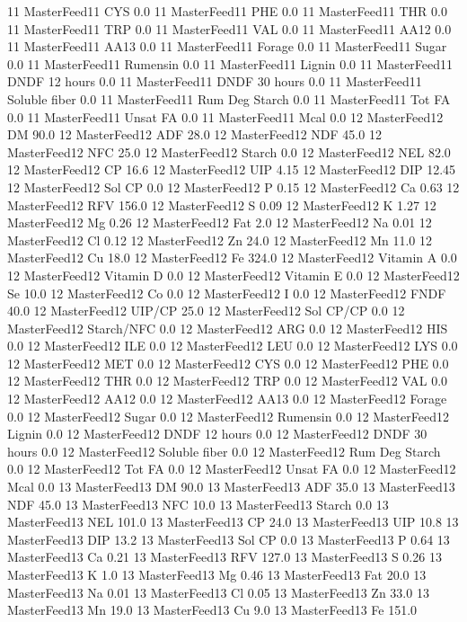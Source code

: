 \documentclass[letterpaper,10pt,english]{sphinxmanual}
\begin{document}
\begin{sphinxVerbatim}[commandchars=\\\{\},numbers=left,firstnumber=1,stepnumber=1]
11 MasterFeed11 CYS 0.0
11 MasterFeed11 PHE 0.0
11 MasterFeed11 THR 0.0
11 MasterFeed11 TRP 0.0
11 MasterFeed11 VAL 0.0
11 MasterFeed11 AA\PYGZsh{}12 0.0
11 MasterFeed11 AA\PYGZsh{}13 0.0
11 MasterFeed11 \PYGZpc{} Forage 0.0
11 MasterFeed11 Sugar \PYGZpc{} 0.0
11 MasterFeed11 Rumensin 0.0
11 MasterFeed11 Lignin 0.0
11 MasterFeed11 DNDF 12 hours 0.0
11 MasterFeed11 DNDF 30 hours 0.0
11 MasterFeed11 Soluble fiber 0.0
11 MasterFeed11 Rum Deg Starch 0.0
11 MasterFeed11 Tot FA 0.0
11 MasterFeed11 Unsat FA 0.0
11 MasterFeed11 Mcal 0.0
12 MasterFeed12 DM 90.0
12 MasterFeed12 ADF 28.0
12 MasterFeed12 NDF 45.0
12 MasterFeed12 NFC 25.0
12 MasterFeed12 Starch 0.0
12 MasterFeed12 NEL 82.0
12 MasterFeed12 CP 16.6
12 MasterFeed12 UIP 4.15
12 MasterFeed12 DIP 12.45
12 MasterFeed12 Sol CP 0.0
12 MasterFeed12 P 0.15
12 MasterFeed12 Ca 0.63
12 MasterFeed12 RFV 156.0
12 MasterFeed12 S 0.09
12 MasterFeed12 K 1.27
12 MasterFeed12 Mg 0.26
12 MasterFeed12 Fat 2.0
12 MasterFeed12 Na 0.01
12 MasterFeed12 Cl 0.12
12 MasterFeed12 Zn 24.0
12 MasterFeed12 Mn 11.0
12 MasterFeed12 Cu 18.0
12 MasterFeed12 Fe 324.0
12 MasterFeed12 Vitamin A 0.0
12 MasterFeed12 Vitamin D 0.0
12 MasterFeed12 Vitamin E 0.0
12 MasterFeed12 Se 10.0
12 MasterFeed12 Co 0.0
12 MasterFeed12 I 0.0
12 MasterFeed12 FNDF 40.0
12 MasterFeed12 UIP/CP 25.0
12 MasterFeed12 Sol CP/CP 0.0
12 MasterFeed12 Starch/NFC 0.0
12 MasterFeed12 ARG 0.0
12 MasterFeed12 HIS 0.0
12 MasterFeed12 ILE 0.0
12 MasterFeed12 LEU 0.0
12 MasterFeed12 LYS 0.0
12 MasterFeed12 MET 0.0
12 MasterFeed12 CYS 0.0
12 MasterFeed12 PHE 0.0
12 MasterFeed12 THR 0.0
12 MasterFeed12 TRP 0.0
12 MasterFeed12 VAL 0.0
12 MasterFeed12 AA\PYGZsh{}12 0.0
12 MasterFeed12 AA\PYGZsh{}13 0.0
12 MasterFeed12 \PYGZpc{} Forage 0.0
12 MasterFeed12 Sugar \PYGZpc{} 0.0
12 MasterFeed12 Rumensin 0.0
12 MasterFeed12 Lignin 0.0
12 MasterFeed12 DNDF 12 hours 0.0
12 MasterFeed12 DNDF 30 hours 0.0
12 MasterFeed12 Soluble fiber 0.0
12 MasterFeed12 Rum Deg Starch 0.0
12 MasterFeed12 Tot FA 0.0
12 MasterFeed12 Unsat FA 0.0
12 MasterFeed12 Mcal 0.0
13 MasterFeed13 DM 90.0
13 MasterFeed13 ADF 35.0
13 MasterFeed13 NDF 45.0
13 MasterFeed13 NFC 10.0
13 MasterFeed13 Starch 0.0
13 MasterFeed13 NEL 101.0
13 MasterFeed13 CP 24.0
13 MasterFeed13 UIP 10.8
13 MasterFeed13 DIP 13.2
13 MasterFeed13 Sol CP 0.0
13 MasterFeed13 P 0.64
13 MasterFeed13 Ca 0.21
13 MasterFeed13 RFV 127.0
13 MasterFeed13 S 0.26
13 MasterFeed13 K 1.0
13 MasterFeed13 Mg 0.46
13 MasterFeed13 Fat 20.0
13 MasterFeed13 Na 0.01
13 MasterFeed13 Cl 0.05
13 MasterFeed13 Zn 33.0
13 MasterFeed13 Mn 19.0
13 MasterFeed13 Cu 9.0
13 MasterFeed13 Fe 151.0

\end{sphinxVerbatim}
\end{document}
